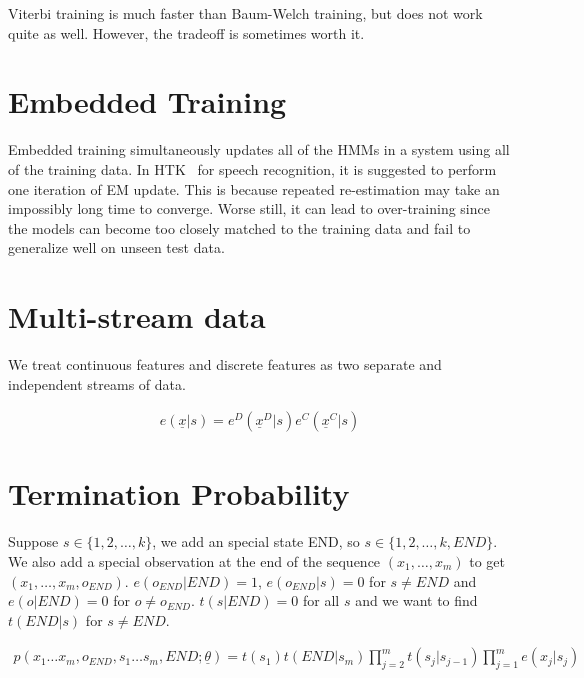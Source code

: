Viterbi training is much faster than Baum-Welch training, but does not work
quite as well. However, the tradeoff is sometimes worth it.

\section{Embedded Training}
Embedded training simultaneously updates all of the HMMs in a system using all
of the training data. In HTK~\cite{young1994} for speech recognition, it is
suggested to perform one iteration of EM update. This is because repeated
re-estimation may take an impossibly long time to converge. Worse still, it can
lead to over-training since the models can become too closely matched to the
training data and fail to generalize well on unseen test data.

\section{Multi-stream data}
We treat continuous features and discrete features as two separate and
independent streams of data.

\begin{align}
e(\underline{x}|s) = e^D(\underline{x}^D|s) e^C(\underline{x}^C|s)
\end{align}

\section{Termination Probability}\label{sec:term}
Suppose $s\in \{1, 2, \ldots, k\}$, we add an special state END, so 
$s\in \{1, 2, \ldots, k, END \}$. We also add a special observation at the end
of the sequence $(x_1, \ldots, x_m)$ to get $(x_1, \ldots, x_m, o_{END})$. 
$e(o_{END} | END) = 1$, $e(o_{END} | s) = 0$ for $s\neq END$ and $e(o | END) = 0$
for $o \neq o_{END}$. $t(s | END) = 0$ for all $s$ and we want to find $t(END | s)$ for
$s\neq END$.

\begin{align}
p(x_1\ldots x_m, o_{END}, s_1\ldots s_m, END;\underline{\theta}) = 
    t(s_1)t(END|s_m)\prod_{j = 2}^m t(s_j | s_{j-1})\prod_{j = 1}^m e(x_j|s_j)
\end{align} 

